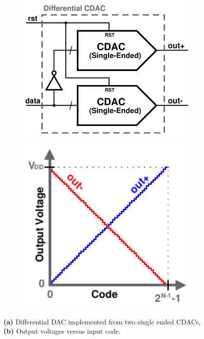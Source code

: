 	\begin{figure}[htb!]
	    \centering
	    \begin{subfigure}{0.5\textwidth}
	        \centering
	        \includegraphics[width=1\textwidth, angle=0]{./figs/design/se_to_diff_cdac}
	        \caption{ }
	        \label{fig:se_to_diff_cdac}
	    \end{subfigure}%
	    \begin{subfigure}{0.5\textwidth}
	        \centering
	        \includegraphics[width=1\textwidth, angle=0]{./figs/design/dac_out}
	        \caption{ }
	        \label{fig:dac_out}
	    \end{subfigure}
	    \label{fig:diff_dac}
	    \caption{\textbf{(a)} Differential DAC implemented from two single ended CDACs, \textbf{(b)} Output voltages versus input code.}
	\end{figure}

